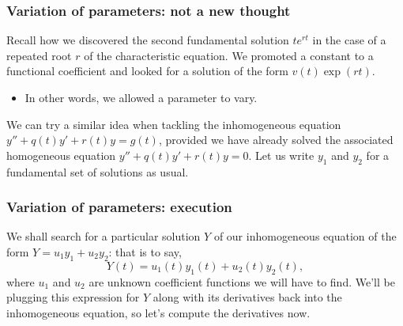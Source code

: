 \begin{frame}

\frametitle{Variation of parameters: not a new thought}
\label{variationofparameters:notanewthought}

Recall how we discovered the second fundamental solution $ t e^{rt} $ in the case of a repeated root $ r $ of the characteristic equation. We promoted a constant to a functional coefficient and looked for a solution of the form $ v(t) \exp{(rt)} $.

\begin{itemize}
\item In other words, we allowed a parameter to vary.

\end{itemize}

We can try a similar idea when tackling the inhomogeneous equation $ y'' + q(t)y' + r(t)y = g(t) $, provided we have already solved the associated homogeneous equation $ y'' + q(t)y' + r(t)y = 0 $. Let us write $ y_1 $ and $ y_2 $ for a fundamental set of solutions as usual.

\end{frame}

\begin{frame}

\frametitle{Variation of parameters: execution}
\label{variationofparameters:execution}

We shall search for a particular solution $ Y $ of our inhomogeneous equation of the form $ Y = u_1 y_1 + u_2 y_2 $: that is to say,
\[
    Y(t) = u_1(t) y_1(t) + u_2(t) y_2(t),
\]
where $ u_1 $ and $ u_2 $ are unknown coefficient functions we will have to find. We'll be plugging this expression for $ Y $ along with its derivatives back into the inhomogeneous equation, so let's compute the derivatives now.

\end{frame}


